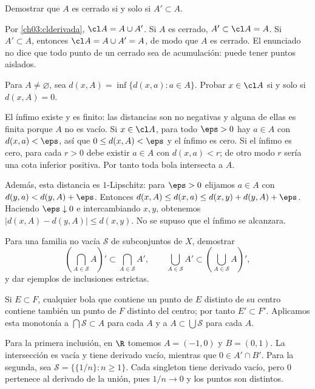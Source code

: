 \begin{ejercicio}\label{ej:lectura-3-6}
Demostrar que $A$ es cerrado si y solo si $A'\subset A$.
\end{ejercicio}
\begin{solucion}
Por \eqref{ch03:clderivada}, $\cl A=A\cup A'$. Si $A$ es cerrado, $A'\subset\cl A=A$. Si $A'\subset A$, entonces $\cl A=A\cup A'=A$, de modo que $A$ es cerrado. El enunciado no dice que todo punto de un cerrado sea de acumulación: puede tener puntos aislados.
\end{solucion}

\begin{ejercicio}\label{ej:lectura-3-7}
Para $A\ne\varnothing$, sea $d(x,A)=\inf\{d(x,a):a\in A\}$. Probar $x\in\cl A$ si y solo si $d(x,A)=0$.
\end{ejercicio}
\begin{solucion}
El ínfimo existe y es finito: las distancias son no negativas y alguna de ellas es finita porque $A$ no es vacío. Si $x\in\cl A$, para todo $\eps>0$ hay $a\in A$ con $d(x,a)<\eps$, así que $0\le d(x,A)<\eps$ y el ínfimo es cero. Si el ínfimo es cero, para cada $r>0$ debe existir $a\in A$ con $d(x,a)<r$; de otro modo $r$ sería una cota inferior positiva. Por tanto toda bola intersecta a $A$.

Además, esta distancia es $1$-Lipschitz: para $\eps>0$ elijamos $a\in A$ con $d(y,a)<d(y,A)+\eps$. Entonces $d(x,A)\le d(x,a)\le d(x,y)+d(y,A)+\eps$. Haciendo $\eps\downarrow0$ e intercambiando $x,y$, obtenemos $|d(x,A)-d(y,A)|\le d(x,y)$. No se supuso que el ínfimo se alcanzara.
\end{solucion}

\begin{ejercicio}\label{ej:lectura-3-8}
Para una familia no vacía $\mathcal S$ de subconjuntos de $X$, demostrar
\[
\left(\bigcap_{A\in\mathcal S}A\right)'\subset\bigcap_{A\in\mathcal S}A',\qquad
\bigcup_{A\in\mathcal S}A'\subset\left(\bigcup_{A\in\mathcal S}A\right)',
\]
y dar ejemplos de inclusiones estrictas.
\end{ejercicio}
\begin{solucion}
Si $E\subset F$, cualquier bola que contiene un punto de $E$ distinto de su centro contiene también un punto de $F$ distinto del centro; por tanto $E'\subset F'$. Aplicamos esta monotonía a $\bigcap\mathcal S\subset A$ para cada $A$ y a $A\subset\bigcup\mathcal S$ para cada $A$.

Para la primera inclusión, en $\R$ tomemos $A=(-1,0)$ y $B=(0,1)$. La intersección es vacía y tiene derivado vacío, mientras que $0\in A'\cap B'$. Para la segunda, sea $\mathcal S=\{\{1/n\}:n\ge1\}$. Cada singleton tiene derivado vacío, pero $0$ pertenece al derivado de la unión, pues $1/n\to0$ y los puntos son distintos.
\end{solucion}

